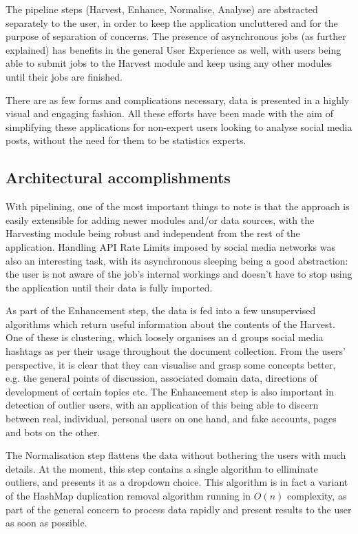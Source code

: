 \documentclass[12pt,a4paper,twoside]{report}
\begin{document}
The pipeline steps (Harvest, Enhance, Normalise, Analyse) are abstracted separately to the user, in order to keep the application uncluttered and for the purpose of separation of concerns. The presence of asynchronous jobs (as further explained) has benefits in the general User Experience as well, with users being able to submit jobs to the Harvest module and keep using any other modules until their jobs are finished.

There are as few forms and complications necessary, data is presented in a highly visual and engaging fashion. All these efforts have been made with the aim of simplifying these applications for non-expert users looking to analyse social media posts, without the need for them to be statistics experts.

\subsection{Architectural accomplishments}
With pipelining, one of the most important things to note is that the approach is easily extensible for adding newer modules and/or data sources, with the Harvesting module being robust and independent from the rest of the application. Handling API Rate Limits imposed by social media networks was also an interesting task, with its asynchronous sleeping being a good abstraction: the user is not aware of the job's internal workings and doesn't have to stop using the application until their data is fully imported.

As part of the Enhancement step, the data is fed into a few unsupervised algorithms which return useful information about the contents of the Harvest. One of these is clustering, which loosely organises an d groups social media hashtags as per their usage throughout the document collection. From the users' perspective, it is clear that they can visualise and grasp some concepts better, e.g. the general points of discussion, associated domain data, directions of development of certain topics etc. The Enhancement step is also important in detection of outlier users, with an application of this being able to discern between real, individual, personal users on one hand, and fake accounts, pages and bots on the other.

The Normalisation step flattens the data without bothering the users with much details. At the moment, this step contains a single algorithm to elliminate outliers, and presents it as a dropdown choice. This algorithm is in fact a variant of the HashMap duplication removal algorithm running in $O(n)$ complexity, as part of the general concern to process data rapidly and present results to the user as soon as possible.
\end{document}
